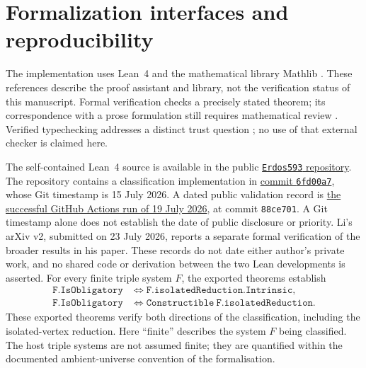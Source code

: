 \documentclass[a4paper,11pt,reqno]{amsart}
\theoremstyle{plain}
\theoremstyle{definition}
\theoremstyle{remark}
\begin{document}
\appendix
\section{Formalization interfaces and reproducibility}\label{appendix-formalization}

The implementation uses Lean~4 \citep{demoura2021} and the mathematical
library Mathlib \citep{mathlib2020}.  These references describe the proof
assistant and library, not the verification status of this manuscript.
Formal verification checks a precisely stated theorem; its correspondence
with a prose formulation still requires mathematical review
\citep{avigadharrison2014}.  Verified typechecking addresses a distinct trust
question \citep{carneiro2025}; no use of that external checker is claimed here.

The self-contained Lean~4 source is available in the public
\href{https://github.com/SamPetkov/Erdos593/blob/main/formalization/Erdos593SelfContained.lean}{\texttt{Erdos593} repository}.
The repository contains a classification implementation in
\href{https://github.com/SamPetkov/Erdos593/commit/6fd00a76064401f3f10aabef474f59d3c6ecd6bf}{commit \texttt{6fd00a7}},
whose Git timestamp is 15 July 2026.  A dated public validation record is
\href{https://github.com/SamPetkov/Erdos593/actions/runs/29682191161}{the successful GitHub Actions run of 19 July 2026},
at commit \texttt{88ce701}.  A Git timestamp alone does not establish the date
of public disclosure or priority.  Li's arXiv v2, submitted on 23 July 2026,
reports a separate formal verification of the broader results in his paper.
These records do not date either author's private work, and no shared code
or derivation between the two Lean developments is asserted.
For every finite triple system $F$, the exported theorems establish
\[
\begin{aligned}
\mathtt{F.IsObligatory}
&\Longleftrightarrow \mathtt{F.isolatedReduction.Intrinsic},\\
\mathtt{F.IsObligatory}
&\Longleftrightarrow \mathtt{Constructible\ F.isolatedReduction}.
\end{aligned}
\]
These exported theorems verify both directions of the classification,
including the isolated-vertex reduction.  Here ``finite'' describes the
system $F$ being classified.  The host triple systems are not assumed finite;
they are quantified within the documented ambient-universe convention of the
formalisation.
\end{document}
